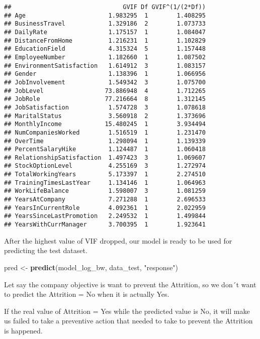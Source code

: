 \documentclass[
]{article}
\newenvironment{Shaded}{\begin{snugshade}}{\end{snugshade}}
\newcommand{\KeywordTok}[1]{\textcolor[rgb]{0.13,0.29,0.53}{\textbf{#1}}}
\newcommand{\NormalTok}[1]{#1}
\newcommand{\StringTok}[1]{\textcolor[rgb]{0.31,0.60,0.02}{#1}}
\begin{document}
\begin{verbatim}
##                               GVIF Df GVIF^(1/(2*Df))
## Age                       1.983295  1        1.408295
## BusinessTravel            1.329186  2        1.073733
## DailyRate                 1.175157  1        1.084047
## DistanceFromHome          1.216231  1        1.102829
## EducationField            4.315324  5        1.157448
## EmployeeNumber            1.182660  1        1.087502
## EnvironmentSatisfaction   1.614912  3        1.083157
## Gender                    1.138396  1        1.066956
## JobInvolvement            1.549342  3        1.075700
## JobLevel                 73.886948  4        1.712265
## JobRole                  77.216664  8        1.312145
## JobSatisfaction           1.574728  3        1.078618
## MaritalStatus             3.560918  2        1.373696
## MonthlyIncome            15.480245  1        3.934494
## NumCompaniesWorked        1.516519  1        1.231470
## OverTime                  1.298094  1        1.139339
## PercentSalaryHike         1.124487  1        1.060418
## RelationshipSatisfaction  1.497423  3        1.069607
## StockOptionLevel          4.255169  3        1.272974
## TotalWorkingYears         5.173397  1        2.274510
## TrainingTimesLastYear     1.134146  1        1.064963
## WorkLifeBalance           1.598007  3        1.081259
## YearsAtCompany            7.271288  1        2.696533
## YearsInCurrentRole        4.092361  1        2.022959
## YearsSinceLastPromotion   2.249532  1        1.499844
## YearsWithCurrManager      3.700395  1        1.923641
\end{verbatim}

After the highest value of VIF dropped, our model is ready to be used
for predicting the test dataset.

\begin{Shaded}
\begin{Highlighting}[]
\NormalTok{pred <-}\StringTok{ }\KeywordTok{predict}\NormalTok{(model_log_bw, data_test, }\StringTok{"response"}\NormalTok{)}
\end{Highlighting}
\end{Shaded}

Let say the company objective is want to prevent the Attrition, so we
don´t want to predict the Attrition = No when it is actually Yes.

If the real value of Attrition = Yes while the predicted value is No, it
will make us failed to take a preventive action that needed to take to
prevent the Attrition is happened.
\end{document}
